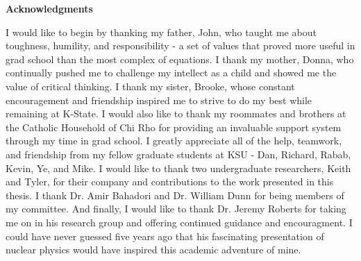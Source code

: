 
\newpage
\vspace*{0.9cm}
\begin{center}
{\bf \Huge Acknowledgments}
\end{center}

\setlength{\baselineskip}{0.8cm}



I would like to begin by thanking my father, John, who taught me about toughness, humility, and responsibility - a set of values that proved more useful in grad school than the most complex of equations.
I thank my mother, Donna, who continually pushed me to challenge my intellect as a child and showed me the value of critical thinking.
I thank my sister, Brooke, whose constant encouragement and friendship inspired me to strive to do my best while remaining at K-State.
I would also like to thank my roommates and brothers at the Catholic Household of Chi Rho for providing an invaluable support system through my time in grad school.
I greatly appreciate all of the help, teamwork, and friendship from my fellow graduate students at KSU - Dan, Richard, Rabab, Kevin, Ye, and Mike.
I would like to thank two undergraduate researchers, Keith and Tyler, for their company and contributions to the work presented in this thesis.
I thank Dr. Amir Bahadori and Dr. William Dunn for being members of my committee.
And finally, I would like to thank Dr. Jeremy Roberts for taking me on in his research group and offering continued guidance and encouragment.
I could have never guessed five years ago that his fascinating presentation of nuclear physics would have inspired this academic adventure of mine.

